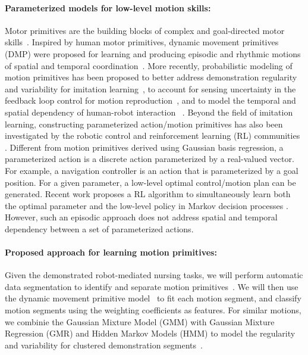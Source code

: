 \documentclass[letterpaper, 11 pt, onecolumn]{article}
\begin{document}
\paragraph*{Parameterized models for low-level motion skills:} Motor primitives are the building blocks of complex and goal-directed motor skills~\cite{flash2005motor}. Inspired by human motor primitives, dynamic movement primitives (DMP) were proposed for learning and producing episodic and rhythmic motions of spatial and temporal coordination~\cite{ijspeert2013dynamical}. More recently, probabilistic modeling of motion primitives has been proposed to better address demonstration regularity and variability for imitation learning~\cite{calinon2007learning,calinon2010learning}, to account for sensing uncertainty in the feedback loop control for motion reproduction~\cite{meier2016probabilistic}, and to model the temporal and spatial dependency of human-robot interaction ~\cite{maeda2017phase}. Beyond the field of imitation learning, constructing parameterized action/motion primitives has also been investigated by the robotic control \cite{fu2013bottom} and reinforcement learning (RL) communities \cite{masson2016reinforcement}. Different from motion primitives derived using Gaussian basis regression, a parameterized action is a discrete action parameterized by a real-valued vector. For example, a navigation controller is an action that is parameterized by a goal position. For a given parameter, a low-level optimal control/motion plan can be generated. Recent work proposes a RL algorithm to simultaneously learn both the optimal parameter and the low-level policy in Markov decision processes \cite{masson2016reinforcement}. However, such an episodic approach does not address spatial and temporal dependency between a set of parameterized actions. 

\paragraph*{Proposed approach for learning motion primitives:} Given the demonstrated robot-mediated nursing tasks, we will perform automatic data segmentation to identify and separate motion primitives~\cite{fod2002automated, barbivc2004segmenting, meier2012movement}. We will then use the dynamic movement primitive model~\cite{ijspeert2013dynamical} to fit each motion segment, and classify motion segments using the weighting coefficients as features. For similar motions, we combinie the Gaussian Mixture Model (GMM) with Gaussian Mixture Regression (GMR) and Hidden Markov Models (HMM) to model the regularity and variability for clustered demonstration segments~\cite{calinon2010learning}. 
\end{document}
